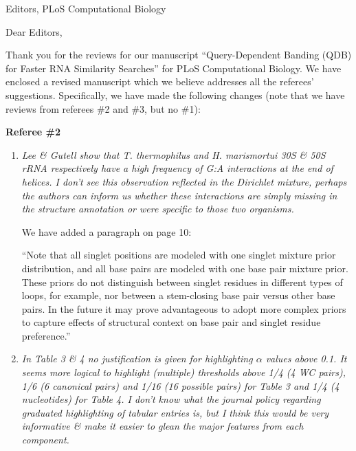 \documentclass{jfrcletter}
\begin{document}
\signature{Sean R. Eddy, Ph.D.}

%
\begin{letter}{Editors, PLoS Computational Biology}

%
\opening{Dear Editors,}

Thank you for the reviews for our manuscript ``Query-Dependent Banding
(QDB) for Faster RNA Similarity Searches'' for PLoS Computational
Biology. We have enclosed a revised manuscript which we believe
addresses all the referees' suggestions. Specifically, we have made
the following changes (note that we have reviews from referees \#2 and
\#3, but no \#1):

\textbf{Referee \#2}

\begin{enumerate}
\item  \emph{\footnotesize Lee \& Gutell show that T. thermophilus and H. marismortui 30S \& 50S
   rRNA respectively have a high frequency of G:A interactions at the end
   of helices. I don't see this observation reflected in the Dirichlet
   mixture, perhaps the authors can inform us whether these interactions
   are simply missing in the structure annotation or were specific to
   those two organisms.}

   We have added a paragraph on page 10:

   ``Note that all singlet positions are modeled with one singlet
   mixture prior distribution, and all base pairs are modeled with one
   base pair mixture prior. These priors do not distinguish between
   singlet residues in different types of loops, for example, nor
   between a stem-closing base pair versus other base pairs. In the
   future it may prove advantageous to adopt more complex priors to
   capture effects of structural context on base pair and
   singlet residue preference.''

\item \emph{\footnotesize In Table 3 \& 4 no justification is given for highlighting
   $\alpha$ values above 0.1. It seems more logical to highlight
   (multiple) thresholds above 1/4 (4 WC pairs), 1/6 (6 canonical
   pairs) and 1/16 (16 possible pairs) for Table 3 and 1/4 (4
   nucleotides) for Table 4. I don't know what the journal policy
   regarding graduated highlighting of tabular entries is, but I
   think this would be very informative \& make it easier to glean the
   major features from each component.}


\end{enumerate}
\end{letter}
\end{document}
